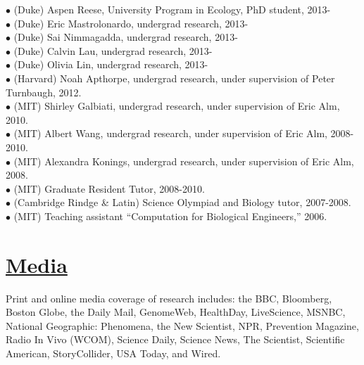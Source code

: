 \documentclass[overlapped,line,11pt]{res}
\begin{document}
\begin{resume}
\hangindent=0.5in 

$\bullet$\hspace{.1in} (Duke) Aspen Reese, University Program in
Ecology, PhD student, 2013- \\
$\bullet$\hspace{.1in} (Duke) Eric Mastrolonardo, undergrad research, 2013- \\
$\bullet$\hspace{.1in} (Duke) Sai Nimmagadda, undergrad research, 2013- \\
$\bullet$\hspace{.1in} (Duke) Calvin Lau, undergrad research, 2013- \\
$\bullet$\hspace{.1in} (Duke) Olivia Lin, undergrad research, 2013- \\
$\bullet$\hspace{.1in} (Harvard) Noah Apthorpe, undergrad research, under
supervision of Peter Turnbaugh, 2012. \\
$\bullet$\hspace{.1in} (MIT) Shirley Galbiati, undergrad research, under
supervision of Eric Alm, 2010. \\
$\bullet$\hspace{.1in} (MIT) Albert Wang, undergrad research, under
supervision of Eric Alm, 2008-2010. \\
$\bullet$\hspace{.1in} (MIT) Alexandra Konings, undergrad research, under
supervision of Eric Alm, 2008. \\
$\bullet$\hspace{.1in} (MIT) Graduate Resident Tutor, 2008-2010. \\
$\bullet$\hspace{.1in} (Cambridge Rindge \& Latin) Science Olympiad and Biology tutor, 2007-2008. \\
$\bullet$\hspace{.1in} (MIT) Teaching assistant ``Computation for Biological Engineers,'' 2006. 

\section{\underline{\sc Media}} 
\vspace{.05in} Print and online media coverage of research includes:
the BBC, Bloomberg, Boston Globe, the Daily Mail, GenomeWeb,
HealthDay, LiveScience, MSNBC, National Geographic: Phenomena, the New
Scientist, NPR, Prevention Magazine, Radio In Vivo (WCOM), Science Daily, Science News, The
Scientist, Scientific American, StoryCollider, USA Today, and Wired.


\end{resume}
\end{document}
